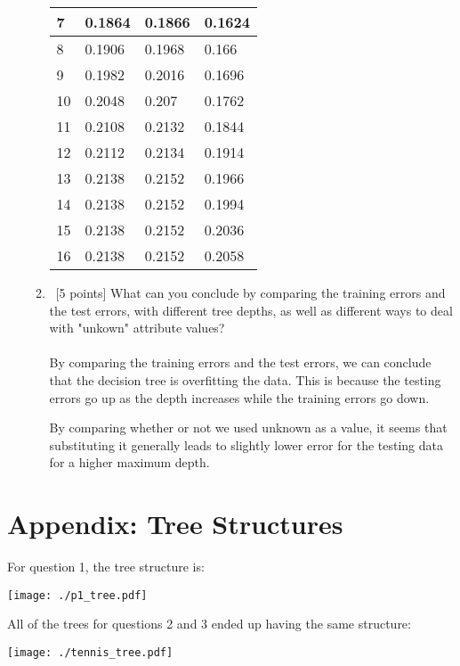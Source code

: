 \documentclass[12pt, fullpage,letterpaper]{article}
\begin{document}
\begin{enumerate}
\begin{enumerate}
\begin{tabular}{|l|l|l|l|}
			7  & 0.1864           & 0.1866     & 0.1624         \\ \hline
			8  & 0.1906           & 0.1968     & 0.166          \\ \hline
			9  & 0.1982           & 0.2016     & 0.1696         \\ \hline
			10 & 0.2048           & 0.207      & 0.1762         \\ \hline
			11 & 0.2108           & 0.2132     & 0.1844         \\ \hline
			12 & 0.2112           & 0.2134     & 0.1914         \\ \hline
			13 & 0.2138           & 0.2152     & 0.1966         \\ \hline
			14 & 0.2138           & 0.2152     & 0.1994         \\ \hline
			15 & 0.2138           & 0.2152     & 0.2036         \\ \hline
			16 & 0.2138           & 0.2152     & 0.2058         \\ \hline
			\end{tabular}
	
	\item~[5 points] What can you conclude by comparing the training errors and the test errors, with different tree depths, as well as different ways to deal with "unkown" attribute values?
\\\\
By comparing the training errors and the test errors, we can conclude that the decision tree is overfitting the data. This is because the testing errors go up as the depth increases while the training errors go down.

By comparing whether or not we used unknown as a value, it seems that substituting it generally leads to slightly lower error for the testing data for a higher maximum depth.
\end{enumerate}
\end{enumerate}
\section*{Appendix: Tree Structures}

For question 1, the tree structure is:

\texttt{[image: ./p1\_tree.pdf]}



All of the trees for questions 2 and 3 ended up having the same structure:


\texttt{[image: ./tennis\_tree.pdf]}
\end{document}
